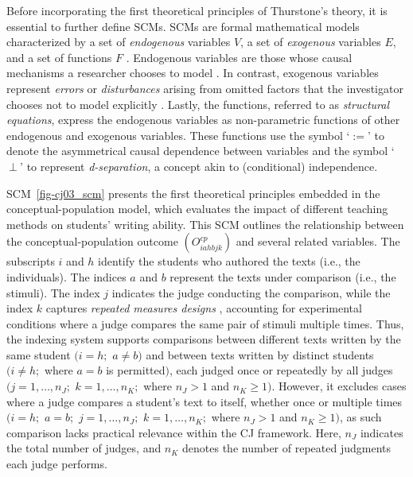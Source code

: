 \documentclass[
  authoryear,
  review,
  1p]{elsarticle}
\begin{document}
Before incorporating the first theoretical principles of Thurstone's
theory, it is essential to further define SCMs. SCMs are formal
mathematical models characterized by a set of \emph{endogenous}
variables \(V\), a set of \emph{exogenous} variables \(E\), and a set of
functions \(F\)
\citep{Pearl_2009, Pearl_et_al_2016, Cinelli_et_al_2020}. Endogenous
variables are those whose causal mechanisms a researcher chooses to
model \citep{Neal_2020}. In contrast, exogenous variables represent
\emph{errors} or \emph{disturbances} arising from omitted factors that
the investigator chooses not to model explicitly \citep{Pearl_2009}.
Lastly, the functions, referred to as \emph{structural equations},
express the endogenous variables as non-parametric functions of other
endogenous and exogenous variables. These functions use the symbol
`\(:=\)' to denote the asymmetrical causal dependence between variables
and the symbol `\(\:\bot\:\)' to represent \emph{d-separation}, a
concept akin to (conditional) independence.

SCM~\ref{fig-cj03_scm} presents the first theoretical principles
embedded in the conceptual-population model, which evaluates the impact
of different teaching methods on students' writing ability. This SCM
outlines the relationship between the conceptual-population outcome
\((O^{cp}_{iahbjk})\) and several related variables. The subscripts
\(i\) and \(h\) identify the students who authored the texts (i.e., the
individuals). The indices \(a\) and \(b\) represent the texts under
comparison (i.e., the stimuli). The index \(j\) indicates the judge
conducting the comparison, while the index \(k\) captures \emph{repeated
measures designs} \citep[pp.~366-376]{Lawson_2015}, accounting for
experimental conditions where a judge compares the same pair of stimuli
multiple times. Thus, the indexing system supports comparisons between
different texts written by the same student \((i = h;\) \(a \neq b)\)
and between texts written by distinct students \((i \neq h;\) where
\(a = b\) is permitted\()\), each judged once or repeatedly by all
judges \((j = 1,\dots,n_{J};\) \(k = 1,\dots,n_K;\) where \(n_{J}>1\)
and \(n_{K}\geq1)\). However, it excludes cases where a judge compares a
student's text to itself, whether once or multiple times \((i = h;\)
\(a = b;\) \(j = 1,\dots,n_{J};\) \(k = 1,\dots,n_{K};\) where
\(n_{J}>1\) and \(n_{K}\geq1)\), as such comparison lacks practical
relevance within the CJ framework. Here, \(n_{J}\) indicates the total
number of judges, and \(n_{K}\) denotes the number of repeated judgments
each judge performs.
\end{document}
